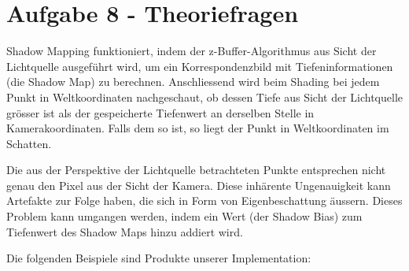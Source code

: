 \documentclass{article} %
\begin{document}
\section*{Aufgabe 8 - Theoriefragen}

Shadow Mapping funktioniert, indem der z-Buffer-Algorithmus aus Sicht der Lichtquelle ausgeführt wird, um ein Korrespondenzbild mit Tiefeninformationen (die Shadow Map) zu berechnen. Anschliessend wird beim Shading bei jedem Punkt in Weltkoordinaten nachgeschaut, ob dessen Tiefe aus Sicht der Lichtquelle grösser ist als der gespeicherte Tiefenwert an derselben Stelle in Kamerakoordinaten. Falls dem so ist, so liegt der Punkt in Weltkoordinaten im Schatten.

Die aus der Perspektive der Lichtquelle betrachteten Punkte entsprechen nicht genau den Pixel aus der Sicht der Kamera. Diese inhärente Ungenauigkeit kann Artefakte zur Folge haben, die sich in Form von Eigenbeschattung äussern. Dieses Problem kann umgangen werden, indem ein Wert (der Shadow Bias) zum Tiefenwert des Shadow Maps hinzu addiert wird.

Die folgenden Beispiele sind Produkte unserer Implementation:
\end{document}
